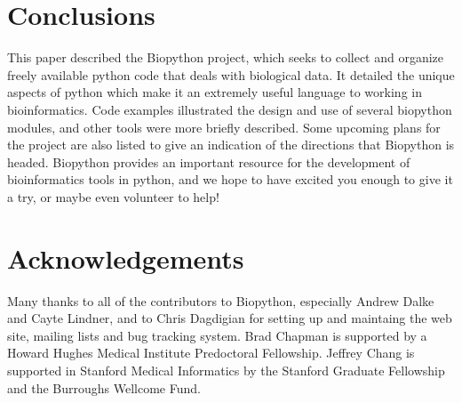 \documentclass[dvips]{article}
\begin{document}
\section{Conclusions}

This paper described the Biopython project, which seeks to collect and organize freely available python code that deals with biological data.  It detailed the unique aspects of python which make it an extremely useful language to working in bioinformatics. Code examples illustrated the design and use of several biopython modules, and other tools were more briefly described. Some upcoming plans for the project are also listed to give an indication of the directions that Biopython is headed.  Biopython provides an important resource for the development of bioinformatics tools in python, and we hope to have excited you enough to give it a try, or maybe even volunteer to help!


\section{Acknowledgements}


Many thanks to all of the contributors to Biopython, especially Andrew Dalke and Cayte Lindner, and to Chris Dagdigian for setting up and maintaing the web site, mailing lists and bug tracking system. Brad Chapman is supported by a Howard Hughes Medical Institute Predoctoral Fellowship. Jeffrey Chang is supported in Stanford Medical Informatics by the Stanford Graduate Fellowship and the Burroughs Wellcome Fund.
\end{document}

